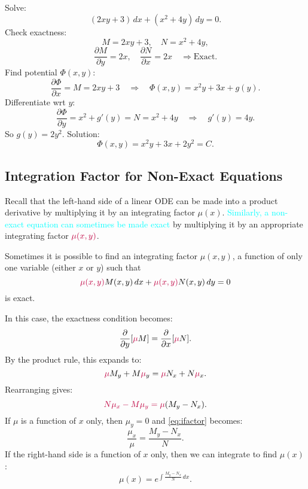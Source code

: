 \begin{example}
Solve:
\[
(2xy + 3)\,dx + (x^2 + 4y)\,dy = 0.
\]
Check exactness:
\[
M=2xy+3, \quad N=x^2+4y,
\]
\[
\frac{\partial M}{\partial y} = 2x, \quad \frac{\partial N}{\partial x} = 2x \quad \Rightarrow \text{Exact.}
\]
Find potential $\Phi(x,y)$:
\[
\frac{\partial \Phi}{\partial x} = M = 2xy+3 \quad \Rightarrow \quad \Phi(x,y) = x^2y+3x+g(y).
\]
Differentiate wrt $y$:
\[
\frac{\partial \Phi}{\partial y} = x^2 + g'(y) = N = x^2+4y \quad \Rightarrow \quad g'(y)=4y.
\]
So $g(y)=2y^2$.  
Solution: 
\[
\Phi(x,y) = x^2y+3x+2y^2 = C.
\]
\end{example}


\subsection{Integration Factor for Non-Exact Equations}
Recall that the left-hand side of a linear ODE can be made into a product derivative by multiplying it by an integrating factor \(\mu(x)\).
\textcolor{cyan}{Similarly, a non-exact equation can sometimes be made exact} by multiplying it by an appropriate integrating factor \(\textcolor{purple}{\mu(x,y)}\).

Sometimes it is possible to find an integrating factor \(\mu(x,y)\), a function of only one variable (either \(x\) or \(y\)) such that
\[\textcolor{purple}{\mu(x,y)} M(x,y)\,dx + \textcolor{purple}{\mu(x,y)} N(x,y)\,dy = 0\]
is exact.

In this case, the exactness condition becomes:
\[\frac{\partial}{\partial y}[\textcolor{purple}{\mu}M] = \frac{\partial}{\partial x}[\textcolor{purple}{\mu} N].\]
By the product rule, this expands to:
\[\textcolor{purple}{\mu} M_y + M \textcolor{purple}{\mu}_y = \textcolor{purple}{\mu}N_x + N \textcolor{purple}{\mu}_x.\]
Rearranging gives:
\begin{equation}\label{eq:ifactor}
\textcolor{purple}{N \textcolor{purple}{\mu}_x - M \textcolor{purple}{\mu}_y = \mu}(M_y - N_x).
\end{equation}
If \(\mu\) is a function of \(x\) only, then \(\mu_y = 0\) and \eqref{eq:ifactor} becomes:
\[\frac{\mu_x}{\mu} = \frac{M_y - N_x}{N}.\]
If the right-hand side is a function of \(x\) only, then we can integrate to find \(\mu(x)\):
\[\mu(x) = e^{\int \frac{M_y - N_x}{N} \, dx}.\]

